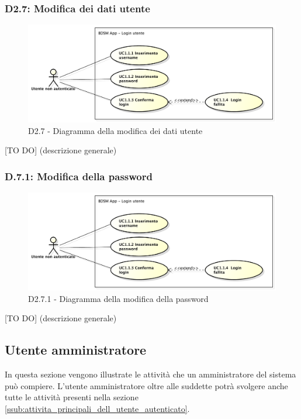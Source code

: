 		\subsubsection{D2.7: Modifica dei dati utente} %
		\label{ssub:modifica_dei_dati_utente}
		\begin{figure}[!htbp]
			\centering
			\centerline{\includegraphics[scale=0.45]{./images/UC1_1.pdf}}
			\caption{D2.7 - Diagramma della modifica dei dati utente}
		\end{figure}
		[TO DO] (descrizione generale)

		\subsubsection{D.7.1: Modifica della password} %
		\label{ssub:modifica_della_password}
		\begin{figure}[!htbp]
			\centering
			\centerline{\includegraphics[scale=0.45]{./images/UC1_1.pdf}}
			\caption{D2.7.1 - Diagramma della modifica della password}
		\end{figure}
		[TO DO] (descrizione generale)


	\pagebreak



	\subsection{Utente amministratore} %
	\label{sub:utente_amministratore}
	In questa sezione vengono illustrate le attività che un amministratore del sistema può compiere. L'utente amministratore oltre alle suddette potrà svolgere anche tutte le attività presenti nella sezione \ref{ssub:attivita_principali_dell_utente_autenticato}.
